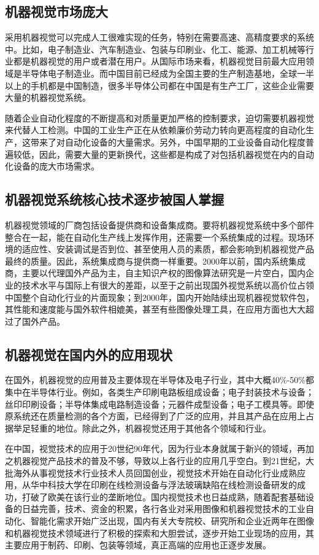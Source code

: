 {\subsection{机器视觉市场庞大}  
采用机器视觉可以完成人工很难实现的任务，特别在需要高速、高精度要求的系统中。比如，电子制造业\citep{.g}、汽车制造业\citep{.c,.c,.b,.2018j}、包装与印刷业、化工、能源、加工机械等行业都是机器视觉的用户或者潜在用户。从国际市场来看，机器视觉目前最大应用领域是半导体电子制造业\citep{.2004}。而中国目前已经成为全国主要的生产制造基地，全球一半以上的手机都是中国制造，很多半导体公司都在中国是有生产工厂，这些企业需要大量的机器视觉系统。  

随着企业自动化程度的不断提高和对质量更加严格的控制要求，迫切需要机器视觉来代替人工检测。中国的工业生产正在从依赖廉价劳动力转向更高程度的自动化生产，这带来了对自动化设备的大量需求。另外，中国早期的工业设备自动化程度普遍较低，因此，需要大量的更新换代，这些都是构成了对包括机器视觉在内的自动化设备的庞大市场需求。  
\subsection{机器视觉系统核心技术逐步被国人掌握  }
机器视觉领域的厂商包括设备提供商和设备集成商。要将机器视觉系统中多个部件整合在一起，能在自动化生产线上发挥作用，还需要一个系统集成的过程。现场环境的适应性、安装调试是否到位、甚至使用人员的素质，都会影响到机器视觉产品最终的质量。因此，系统集成商与提供商一样重要。2000年以前，国内系统集成商，主要以代理国外产品为主，自主知识产权的图像算法研究是一片空白，国内企业的技术水平与国际上有很大的差距，以至于之前出现国外视觉系统以高价位占领中国整个自动化行业的片面现象；到2000年，国内开始陆续出现机器视觉软件包，其性能和速度能与国外软件相媲美，甚至有些图像处理工具，在应用方面也大大超过了国外产品。  
\subsection{机器视觉在国内外的应用现状}
在国外\citep{.1992}，机器视觉的应用普及主要体现在半导体及电子行业，其中大概40\%-50\%都集中在半导体行业。例如，各类生产印刷电路板组成设备；电子封装技术与设备；丝印印刷设备；半导体集成电路制造设备；元器件成型设备；电子工模具等。即使原系统还在质量检测的各个方面，已经得到了广泛的应用，并且其产品在应用上占据举足轻重的地位。除此之外，机器视觉还用于其他各个领域和行业。 
 
在中国，视觉技术的应用于20世纪90年代，因为行业本身就属于新兴的领域，再加之机器视觉产品技术的普及不够，导致以上各行业的应用几乎空白。到21世纪，大批海外从事视觉技术行业技术人员回国创业，视觉技术开始在自动化行业成熟应用，从华中科技大学在印刷在线检测设备与浮法玻璃缺陷在线检测设备研发的成功，打破了欧美在该行业的垄断地位。国内视觉技术也日益成熟，随着配套基础设备的日益完善，技术、资金的积累，各行各业对采用图像和机器视觉技术的工业自动化、智能化需求开始广泛出现，国内有关大专院校、研究所和企业近两年在图像和机器视觉技术领域进行了积极的探索和大胆尝试，逐步开始工业现场的应用，其主要应用于制药、印刷、包装等领域，真正高端的应用也正逐步发展。  
}

